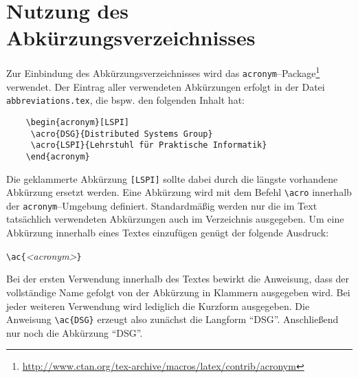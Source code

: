 %
\section{Nutzung des Abkürzungsverzeichnisses}
%
Zur Einbindung des Abkürzungsverzeichnisses wird das \texttt{acronym}--Package\footnote{\url{http://www.ctan.org/tex-archive/macros/latex/contrib/acronym}} verwendet.
Der Eintrag aller verwendeten Abkürzungen erfolgt in der Datei \texttt{abbreviations.tex}, die bspw. den folgenden Inhalt hat:
%
\begin{verbatim}
	\begin{acronym}[LSPI]
	 \acro{DSG}{Distributed Systems Group}
	 \acro{LSPI}{Lehrstuhl für Praktische Informatik}
	\end{acronym}
\end{verbatim}
%
Die geklammerte Abkürzung \texttt{[LSPI]} sollte dabei durch die längste vorhandene Abkürzung ersetzt werden.
Eine Abkürzung wird mit dem Befehl \texttt{\textbackslash acro} innerhalb der \texttt{acronym}--Umgebung definiert.
Standardmäßig werden nur die im Text tatsächlich verwendeten Abkürzungen auch im Verzeichnis ausgegeben.
Um eine Abkürzung innerhalb eines Textes einzufügen genügt der folgende Ausdruck:

\texttt{\textbackslash ac\{}\textit{<acronym>}\texttt{\}}

Bei der ersten Verwendung innerhalb des Textes bewirkt die Anweisung, dass der vollständige Name gefolgt von der Abkürzung in Klammern ausgegeben wird.
Bei jeder weiteren Verwendung wird lediglich die Kurzform ausgegeben. Die Anweisung \texttt{\textbackslash ac\{DSG\}} erzeugt also zunächst die Langform "`\ac{DSG}"'.
Anschließend nur noch die Abkürzung "`\ac{DSG}"'.